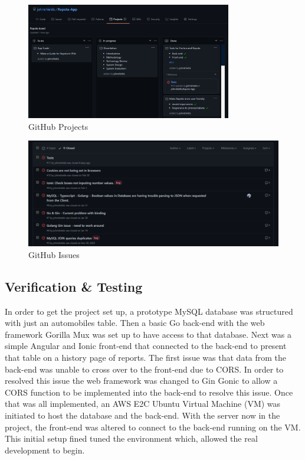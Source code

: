 \begin{figure}[!ht]
    \caption{GitHub Projects}
    \label{image:gitProjects}
    \centering
    \includegraphics[width=0.8\textwidth]{images/misc/git-projects.png}
\end{figure}

\begin{figure}[!ht]
    \caption{GitHub Issues}
    \label{image:gitIssues}
    \centering
    \includegraphics[width=0.8
    \textwidth]{images/misc/git-issues.png}
\end{figure}

\subsection{Verification \& Testing}
In order to get the project set up, a prototype MySQL database was structured with just an automobiles table. Then a basic Go back-end with the web framework Gorilla Mux was set up to have access to that database. Next was a simple Angular and Ionic front-end that connected to the back-end to present that table on a history page of reports. The first issue was that data from the back-end was unable to cross over to the front-end due to CORS. In order to resolved this issue the web framework was changed to Gin Gonic to allow a CORS function to be implemented into the back-end to resolve this issue. Once that was all implemented, an AWS E2C Ubuntu Virtual Machine (VM) was initiated to host the database and the back-end. With the server now in the project, the front-end was altered to connect to the back-end running on the VM. This initial setup fined tuned the environment which, allowed the real development to begin. 

